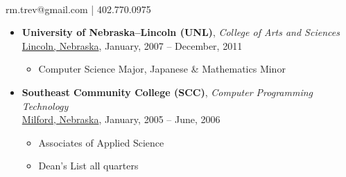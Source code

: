 \documentclass[12pt]{report}
\begin{document}
\noindent\colorbox{MidnightBlue}{%
\noindent\parbox{8.0in}{\textcolor{White}{%
\begin{center}
\vspace{0.0625in}
\vspace{0.0625in}
\end{center}
}}}

\begin{center}
 \\
\noindent\textsf{rm.trev@gmail.com | 402.770.0975}
\end{center}

\begin{center}
\noindent\parbox{6.5in}{{\small

\begin{itemize}
\item\textbf{University of Nebraska--Lincoln (UNL)}, \textit{College of Arts and Sciences}\\
\underline{Lincoln, Nebraska}, January, 2007 -- December, 2011
\begin{itemize}
\item Computer Science Major, Japanese \& Mathematics Minor
\end{itemize}
\item\textbf{Southeast Community College (SCC)}, \textit{Computer Programming Technology}\\
\underline{Milford, Nebraska}, January, 2005 -- June, 2006
\begin{itemize}
\item Associates of Applied Science
\item Dean's List all quarters
\end{itemize}
\end{itemize}

}}
\end{center}
\end{document}
